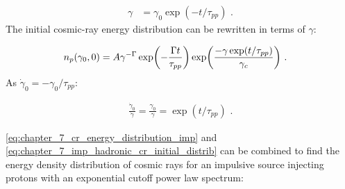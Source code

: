 \begin{equation}
    \begin{aligned}
        \gamma&=\gamma_0\exp(-t/\tau_{pp})\text{ .}
    \end{aligned} \label{eq:chapter_7_hadron_loss_solution}
\end{equation}
\noindent The initial cosmic-ray energy distribution can be rewritten in terms of $\gamma$:

\begin{equation}
    \begin{aligned}
    	n_p\qty(\gamma_0,0)&=A\gamma^{-\Gamma} \exp(-\frac{\Gamma t}{\tau_{pp}})\exp(\frac{-\gamma\exp(t/\tau_{pp})}{\gamma_c}) \text{ .}
    \end{aligned} \label{eq:chapter_7_imp_hadronic_cr_initial_distrib}
\end{equation}
\noindent As $\dot{\gamma}_0=-\gamma_0/\tau_{pp}$:

\begin{equation}
	\begin{aligned}
		\frac{\dot{\gamma}_0}{\dot{\gamma}}=\frac{\gamma_0}{\gamma}=\exp(t/\tau_{pp})\text{ .}
	\end{aligned} \label{eq:07_hadron_gammadot_ratio}
\end{equation}

\autoref{eq:chapter_7_cr_energy_distribution_imp} and \autoref{eq:chapter_7_imp_hadronic_cr_initial_distrib} can be combined to find the energy density distribution of cosmic rays for an impulsive source injecting protons with an exponential cutoff power law spectrum:


